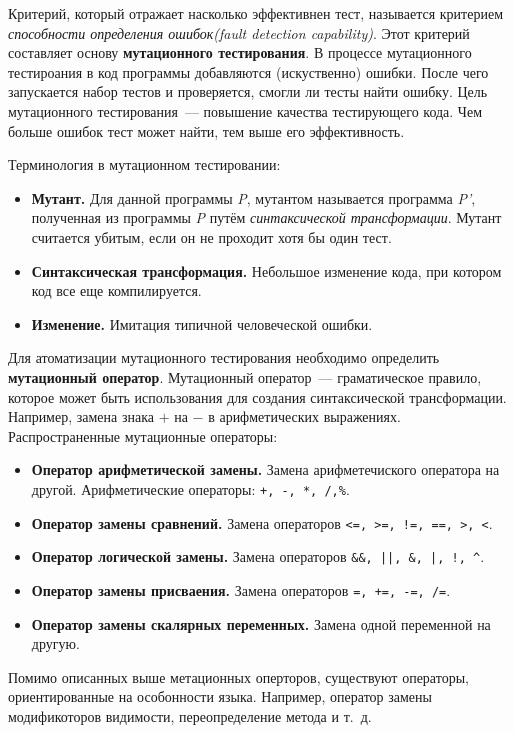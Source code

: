 Критерий, который отражает насколько эффективнен тест, называется критерием \textit{способности определения ошибок(fault detection capability)}. Этот критерий составляет основу \textbf{мутационного тестирования}. В процессе мутационного тестироания в код программы добавляются (искуственно) ошибки. После чего запускается набор тестов и проверяется, смогли ли тесты найти ошибку. Цель мутационного тестирования~--- повышение качества тестирующего кода. Чем больше ошибок тест может найти, тем выше его эффективность.

Терминология в мутационном тестировании:

\begin{itemize}
	\item \textbf{Мутант.} Для данной программы \textit{P}, мутантом называется программа \textit{P'}, полученная из программы \textit{P} путём \textit{синтаксической трансформации}. Мутант считается убитым, если он не проходит хотя бы один тест.
	\item \textbf{Синтаксическая трансформация.} Небольшое изменение кода, при котором код все еще компилируется.
	\item \textbf{Изменение.} Имитация типичной человеческой ошибки. 
\end{itemize}

Для атоматизации мутационного тестирования необходимо определить \textbf{мутационный оператор}. Мутационный оператор~--- граматическое правило, которое может быть использования для создания синтаксической трансформации. Например, замена знака \(+\) на 
\(-\) в арифметических выражениях. Распространенные мутационные операторы:

\begin{itemize}
	\item \textbf{Оператор арифметической замены.} Замена арифметечиского оператора на другой. Арифметические операторы: \texttt{+, -, *, /,\%}.
	\item \textbf{Оператор замены сравнений.} Замена операторов \texttt{<=, >=, !=, ==, >, <}.
	\item \textbf{Оператор логической замены.} Замена операторов \texttt{\&\&, ||, \&, |, !, \^}.
	\item \textbf{Оператор замены присваения.} Замена операторов \texttt{=, +=, -=, /=}.
	\item \textbf{Оператор замены скалярных переменных.}  Замена одной переменной на другую.
\end{itemize}

Помимо описанных выше метационных оперторов, существуют операторы, ориентированные на особонности языка. Например, оператор замены модификоторов видимости, переопределение метода и т.~д.

